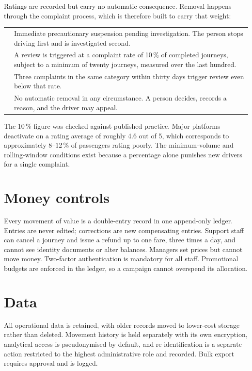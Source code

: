 Ratings are recorded but carry no automatic consequence. Removal happens through the complaint
process, which is therefore built to carry that weight:

\begin{center}
\begin{tabularx}{\textwidth}{@{}L{48mm}Y@{}}
\toprule
{} & Immediate precautionary suspension pending investigation. The person stops driving first and is investigated second. \\
 & A review is triggered at a complaint rate of 10\,\% of completed journeys, subject to a minimum of twenty journeys, measured over the last hundred. \\
 & Three complaints in the same category within thirty days trigger review even below that rate. \\
 & No automatic removal in any circumstance. A person decides, records a reason, and the driver may appeal. \\
\bottomrule
\end{tabularx}
\end{center}

The 10\,\% figure was checked against published practice. Major platforms deactivate on a rating
average of roughly 4.6 out of 5, which corresponds to approximately 8--12\,\% of passengers rating
poorly. The minimum-volume and rolling-window conditions exist because a percentage alone punishes
new drivers for a single complaint.

\section{Money controls}

Every movement of value is a double-entry record in one append-only ledger. Entries are never
edited; corrections are new compensating entries. Support staff can cancel a journey and issue a
refund up to one fare, three times a day, and cannot see identity documents or alter balances.
Managers set prices but cannot move money. Two-factor authentication is mandatory for all staff.
Promotional budgets are enforced in the ledger, so a campaign cannot overspend its allocation.

\section{Data}

All operational data is retained, with older records moved to lower-cost storage rather than
deleted. Movement history is held separately with its own encryption, analytical access is
pseudonymised by default, and re-identification is a separate action restricted to the highest
administrative role and recorded. Bulk export requires approval and is logged.

